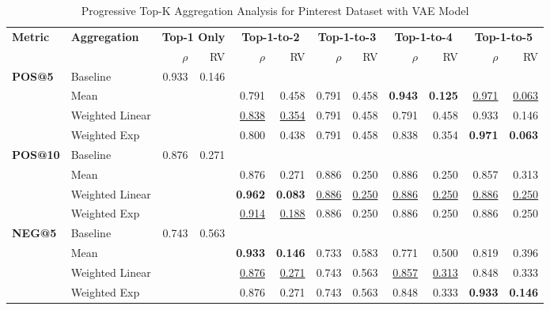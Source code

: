 \documentclass{article}
\begin{document}
\begin{table}[htbp]
\centering
\caption{Progressive Top-K Aggregation Analysis for Pinterest Dataset with VAE Model}
\label{tab:pinterest_vae_progressive_topk}
\scriptsize
\begin{tabular}{@{}llrr|rr|rr|rr|rr@{}}
\toprule
\multirow{2}{*}{\textbf{Metric}} & \multirow{2}{*}{\textbf{Aggregation}} & \multicolumn{2}{c|}{\textbf{Top-1 Only}} & \multicolumn{2}{c|}{\textbf{Top-1-to-2}} & \multicolumn{2}{c|}{\textbf{Top-1-to-3}} & \multicolumn{2}{c|}{\textbf{Top-1-to-4}} & \multicolumn{2}{c}{\textbf{Top-1-to-5}} \\
\cmidrule(lr){3-4} \cmidrule(lr){5-6} \cmidrule(lr){7-8} \cmidrule(lr){9-10} \cmidrule(lr){11-12}
& & $\rho$ & RV & $\rho$ & RV & $\rho$ & RV & $\rho$ & RV & $\rho$ & RV \\
\midrule

\multirow{4}{*}{\textbf{POS@5}} 
& Baseline & 0.933 & 0.146 & & & & & & & & \\
& Mean & & & 0.791 & 0.458 & 0.791 & 0.458 & \textbf{0.943} & \textbf{0.125} & \uline{0.971} & \uline{0.063} \\
& Weighted Linear & & & \uline{0.838} & \uline{0.354} & 0.791 & 0.458 & 0.791 & 0.458 & 0.933 & 0.146 \\
& Weighted Exp & & & 0.800 & 0.438 & 0.791 & 0.458 & 0.838 & 0.354 & \textbf{0.971} & \textbf{0.063} \\
\midrule

\multirow{4}{*}{\textbf{POS@10}} 
& Baseline & 0.876 & 0.271 & & & & & & & & \\
& Mean & & & 0.876 & 0.271 & 0.886 & 0.250 & 0.886 & 0.250 & 0.857 & 0.313 \\
& Weighted Linear & & & \textbf{0.962} & \textbf{0.083} & \uline{0.886} & \uline{0.250} & \uline{0.886} & \uline{0.250} & \uline{0.886} & \uline{0.250} \\
& Weighted Exp & & & \uline{0.914} & \uline{0.188} & 0.886 & 0.250 & 0.886 & 0.250 & 0.886 & 0.250 \\
\midrule

\multirow{4}{*}{\textbf{NEG@5}} 
& Baseline & 0.743 & 0.563 & & & & & & & & \\
& Mean & & & \textbf{0.933} & \textbf{0.146} & 0.733 & 0.583 & 0.771 & 0.500 & 0.819 & 0.396 \\
& Weighted Linear & & & \uline{0.876} & \uline{0.271} & 0.743 & 0.563 & \uline{0.857} & \uline{0.313} & 0.848 & 0.333 \\
& Weighted Exp & & & 0.876 & 0.271 & 0.743 & 0.563 & 0.848 & 0.333 & \textbf{0.933} & \textbf{0.146} \\
\midrule


\end{tabular}
\end{table}
\end{document}

